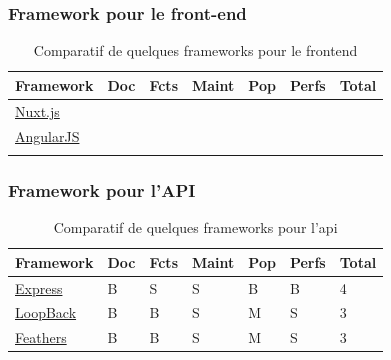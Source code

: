 \subsubsection*{Framework pour le front-end}
\begin{table}[h]
    \centering
    \begin{tabular}{| l | l | l | l | l | l | l |}
    \hline
        Framework & Doc & Fcts & Maint & Pop & Perfs & Total \\
    \hline
        \href{https://nuxtjs.org/}{Nuxt.js} &
        &  
        &
        &            
        &              
        &       \\
    \hline
        \href{https://angularjs.org/}{AngularJS} &
        &                
        &   
        &
        &              
        &       \\
    \hline
        \href{}{} &
        &                
        &     
        &
        &              
        &       \\  
    \hline
    \end{tabular}
    \caption{Comparatif de quelques frameworks pour le \Gls{frontend}}
    \label{table:compFrameworksFrontend}
\end{table}


\subsubsection*{Framework pour l'API}


\begin{table}[h]
    \centering
    \begin{tabular}{| l | l | l | l | l | l | l |}
    \hline
        Framework & Doc & Fcts & Maint & Pop & Perfs & Total \\
    \hline
        \href{https://expressjs.com/}{Express} &
        B &  
        S &
        S &            
        B &              
        B &
        4 \\
    \hline
        \href{https://loopback.io/}{LoopBack} &
        B &                
        B &   
        S &
        M &              
        S &      
        3 \\
    \hline
        \href{https://feathersjs.com/}{Feathers} &
        B &                
        B &     
        S &
        M &              
        S &       
        3 \\  
    \hline
    \end{tabular}
    \caption{Comparatif de quelques frameworks pour l'\Gls{api}}
    \label{table:compFrameworksAPI}
\end{table}

